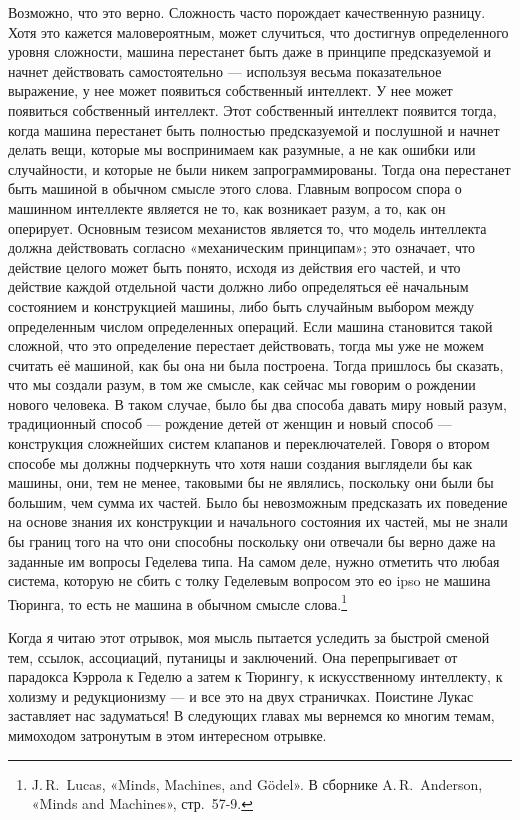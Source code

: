 \documentclass[../main.tex]{subfiles}
\begin{document}
Возможно, что это верно. Сложность часто порождает качественную разницу. Хотя это кажется маловероятным, может случиться, что достигнув определенного уровня сложности, машина перестанет быть даже в принципе предсказуемой и начнет действовать самостоятельно --- используя весьма показательное выражение, у нее может появиться собственный интеллект. У нее может появиться собственный интеллект. Этот собственный интеллект появится тогда, когда машина перестанет быть полностью предсказуемой и послушной и начнет делать вещи, которые мы воспринимаем как разумные, а не как ошибки или случайности, и которые не были никем запрограммированы. Тогда она перестанет быть машиной в обычном смысле этого слова. Главным вопросом спора о машинном интеллекте является не то, как возникает разум, а то, как он оперирует. Основным тезисом механистов является то, что модель интеллекта должна действовать согласно «механическим принципам»; это означает, что действие целого может быть понято, исходя из действия его частей, и что действие каждой отдельной части должно либо определяться её начальным состоянием и конструкцией машины, либо быть случайным выбором между определенным числом определенных операций. Если машина становится такой сложной, что это определение перестает действовать, тогда мы уже не можем считать её машиной, как бы она ни была построена. Тогда пришлось бы сказать, что мы создали разум, в том же смысле, как сейчас мы говорим о рождении нового человека. В таком случае, было бы два способа давать миру новый разум, традиционный способ --- рождение детей от женщин и новый способ --- конструкция сложнейших систем клапанов и переключателей. Говоря о втором способе мы должны подчеркнуть что хотя наши создания выглядели бы как машины, они, тем не менее, таковыми бы не являлись, поскольку они были бы большим, чем сумма их частей. Было бы невозможным предсказать их поведение на основе знания их конструкции и начального состояния их частей, мы не знали бы границ того на что они способны поскольку они отвечали бы верно даже на заданные им вопросы Геделева типа. На самом деле, нужно отметить что любая система, которую не сбить с толку Геделевым вопросом это ео ipso не машина Тюринга, то есть не машина в обычном смысле слова.\footnote{J.\,R.~Lucas, «Minds, Machines, and Gödel». В сборнике A.\,R.~Anderson, «Minds and Machines», стр.~57-9.}

Когда я читаю этот отрывок, моя мысль пытается уследить за быстрой сменой тем, ссылок, ассоциаций, путаницы и заключений. Она перепрыгивает от парадокса Кэррола к Геделю а затем к Тюрингу, к искусственному интеллекту, к холизму и редукционизму --- и все это на двух страничках. Поистине Лукас заставляет нас задуматься! В следующих главах мы вернемся ко многим темам, мимоходом затронутым в этом интересном отрывке.
\end{document}
